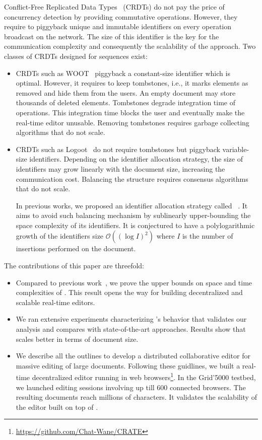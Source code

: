 Conflict-Free Replicated Data Types~\cite{shapiro2011comprehensive} (CRDTs) do
not pay the price of concurrency detection by providing commutative
operations. However, they require to piggyback unique and immutable identifiers
on every operation broadcast on the network. The size of this identifier is the
key for the communication complexity and consequently the scalability of the
approach. Two classes of CRDTs designed for sequences exist:
\begin{itemize}
\item CRDTs such as WOOT~\cite{oster2006data} piggyback a constant-size
  identifier which is optimal. However, it requires to keep tombstones, i.e., it
  marks elements as removed and hide them from the users. An empty document may
  store thousands of deleted elements. Tombstones degrade integration time of
  operations. This integration time blocks the user and eventually make the
  real-time editor unusable. Removing tombstones requires garbage
  collecting algorithms that do not scale.
\item CRDTs such as Logoot~\cite{weiss2010logootundo} do not require tombstones
  but piggyback variable-size identifiers. Depending on the identifier
  allocation strategy, the size of identifiers may grow linearly with the
  document size, increasing the communication cost. Balancing the structure
  requires consensus algorithms that do not scale.

  In previous works, we proposed an identifier allocation strategy called
  \LSEQ~\cite{nedelec2013concurrency, nedelec2013lseq}. It aims to avoid such
  balancing mechanism by sublinearly upper-bounding the space complexity of its
  identifiers. It is conjectured to have a polylogarithmic growth of the
  identifiers size $\mathcal{O}((\log I)^2)$ where $I$ is the number of
  insertions performed on the document.
\end{itemize}

\noindent The contributions of this paper are threefold:
\begin{itemize}
\item Compared to previous work~\cite{nedelec2013concurrency, nedelec2013lseq},
  we prove the upper bounds on space and time complexities of \LSEQ. This result
  opens the way for building decentralized and scalable real-time editors.
\item We ran extensive experiments characterizing \LSEQ's behavior that
  validates our analysis and compares with state-of-the-art approaches. Results
  show that \LSEQ scales better in terms of document size.
\item We describe all the outlines to develop a distributed collaborative editor
  for massive editing of large documents. Following these guidlines, we built a
  real-time decentralized editor running in web
  browsers\footnote{\url{https://github.com/Chat-Wane/CRATE}}. In the Grid'5000
  testbed, we launched editing sessions involving up till 600 connected
  browsers. The resulting documents reach millions of characters. It validates
  the scalability of the editor built on top of \LSEQ.
\end{itemize}

